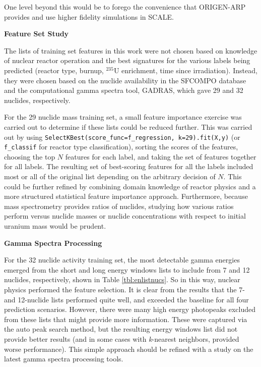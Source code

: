 One level beyond this would be to forego the convenience that \gls{ORIGEN-ARP}
provides and use higher fidelity simulations in \gls{SCALE}. 

\noindent \textbf{Feature Set Study}

The lists of training set features in this work were not chosen based on
knowledge of nuclear reactor operation and the best signatures for the various
labels being predicted (reactor type, burnup, ${}^{235}\text{U}$ enrichment,
time since irradiation).  Instead, they were chosen based on the nuclide
availability in the \gls{SFCOMPO} database and the computational gamma spectra
tool, \gls{GADRAS}, which gave 29 and 32 nuclides, respectively. 

For the 29 nuclide mass training set, a small feature importance exercise was
carried out to determine if these lists could be reduced further. This was
carried out by using \texttt{SelectKBest(score\_func=f\_regression,
k=29).fit(X,y)} (or \texttt{f\_classif} for reactor type classification),
sorting the scores of the features, choosing the top $N$ features for each
label, and taking the set of features together for all labels.  The resulting
set of best-scoring features for all the labels included most or all of the
original list depending on the arbitrary decision of $N$.  This could be
further refined by combining domain knowledge of reactor physics and a more
structured statistical feature importance approach. Furthermore, because mass
spectrometry provides ratios of nuclides, studying how various ratios perform
versus nuclide masses or nuclide concentrations with respect to initial uranium
mass would be prudent. 

\noindent \textbf{Gamma Spectra Processing}

For the 32 nuclide activity training set, the most detectable gamma energies
emerged from the short and long energy windows lists to include from 7 and 12
nuclides, respectively, shown in Table \ref{tbl:enlistnucs}. So in this way,
nuclear physics performed the feature selection.  It is clear from the results
that the 7- and 12-nuclide lists performed quite well, and exceeded the
baseline for all four prediction scenarios.  However, there were many high
energy photopeaks excluded from these lists that might provide more
information. These were captured via the auto peak search method, but the
resulting energy windows list did not provide better results (and in some cases
with \textit{k}-nearest neighbors, provided worse performance).  This simple
approach should be refined with a study on the latest gamma spectra
processing tools. 

